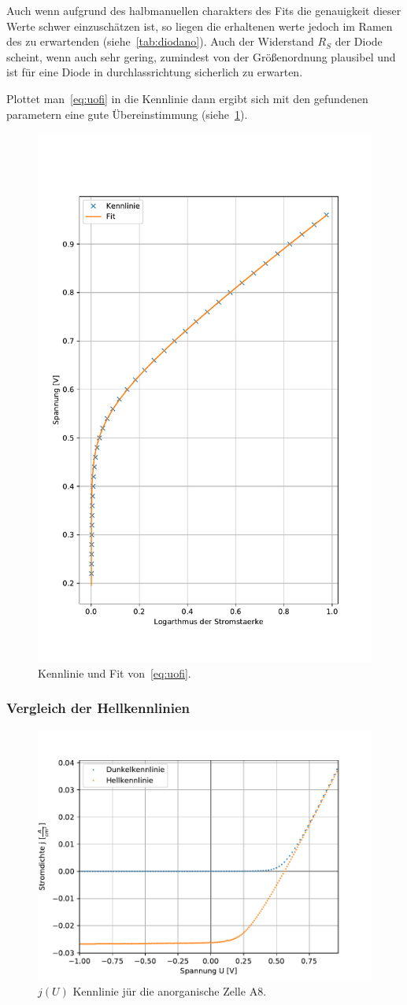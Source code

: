 \documentclass[slug=SZ, room=Hermann-Krone-Bau\,\ Labor\ 1.25, supervisor=Martin\ Kroll]{../../Lab_Report_LaTeX/lab_report}
\begin{document}
Auch wenn aufgrund des halbmanuellen charakters des Fits die
genauigkeit dieser Werte schwer einzusch\"atzen ist, so liegen die
erhaltenen werte jedoch im Ramen des zu erwartenden
(siehe~\ref{tab:diodano}). Auch der Widerstand \(R_S\) der Diode
scheint, wenn auch sehr gering, zumindest von der Gr\"o\ss{}enordnung
plausibel und ist f\"ur eine Diode in durchlassrichtung sicherlich zu
erwarten.

Plottet man~\ref{eq:uofi} in die Kennlinie dann ergibt sich mit den
gefundenen parametern eine gute \"Ubereinstimmung (siehe~\ref{fig:a-anorg-log}).


\begin{figure}[H]\centering
  \includegraphics[width=.5\columnwidth]{./figs/python/A/dark_an_fit_final.pdf}
  \caption{Kennlinie und Fit von~\ref{eq:uofi}.}
  \label{fig:a-anorg-log}
\end{figure}

\subsubsection{Vergleich der Hellkennlinien}
\label{sec:vglhell}

\begin{figure}[H]\centering
  \includegraphics[width=.7\columnwidth]{./figs/python/A/anorg_combined.pdf}
  \caption{\(j(U)\) Kennlinie j\"ur die anorganische Zelle A8.}
  \label{fig:a-anorg-combined}
\end{figure}
\end{document}

